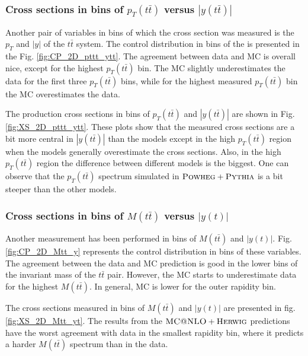 
\subsubsection{Cross sections in bins of $p_{T}(t\bar{t})$ versus $|y(t\bar{t})|$}

Another pair of variables in bins of which the cross section was measured is the $p_{T}$ and $|y|$ of the $t\bar{t}$ system. 
The control distribution in bins of the is presented in the Fig. \ref{fig:CP_2D_pttt_ytt}. The agreement between data and MC is overall nice, 
except for the highest $p_{T}(t\bar{t})$ bin. The MC slightly underestimates the data for the first three $p_{T}(t\bar{t})$ bins, while
for the highest measured $p_{T}(t\bar{t})$ bin the MC overestimates the data. 

The production cross sections in bins of $p_{T}(t\bar{t})$ and $|y(t\bar{t})|$ are shown in Fig. \ref{fig:XS_2D_pttt_ytt}.
These plots show that the measured cross sections are a bit more central in $|y(t\bar{t})|$ than the models except in the 
high $p_{T}(t\bar{t})$ region when the models generally overestimate the cross sections. Also, in the high $p_{T}(t\bar{t})$
region the difference between different models is the biggest. One can observe that the $p_{T}(t\bar{t})$ spectrum simulated
in $\textsc{Powheg}+\textsc{Pythia}$ is a bit steeper than the other models.


\subsubsection{Cross sections in bins of $M(t\bar{t})$ versus $|y(t)|$}

Another measurement has been performed in bins of $M(t\bar{t})$ and $|y(t)|$. Fig. \ref{fig:CP_2D_Mtt_y} represents the control distribution in bins of these variables.
The agreement between the data and MC prediction is good in the lower bins of the invariant mass of the $t\bar{t}$ pair. 
However, the MC starts to underestimate data for the highest $M(t\bar{t})$. In general, MC is lower for the outer rapidity 
bin. 

The cross sections measured in bins of $M(t\bar{t})$ and $|y(t)|$ are presented in fig. \ref{fig:XS_2D_Mtt_yt}. The results
from the $\textsc{MC@NLO}+\textsc{Herwig}$ predictions have the worst agreement with data in the smallest rapidity bin, where it predicts a 
harder $M(t\bar{t})$ spectrum than in the data.


